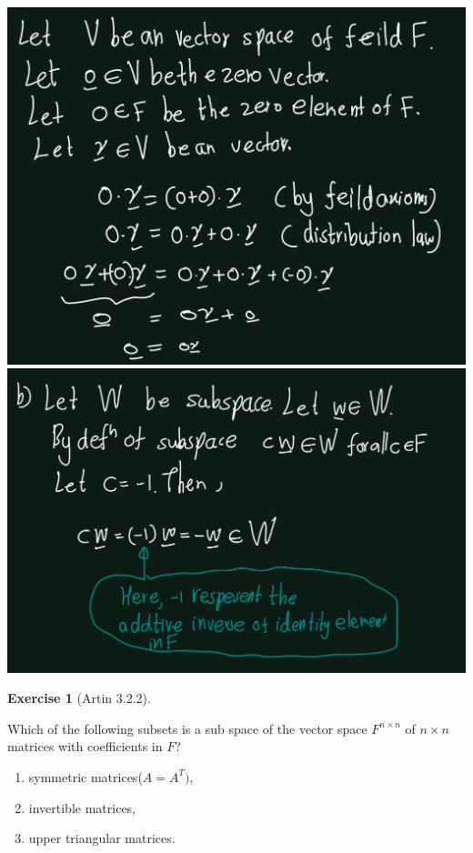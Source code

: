 \documentclass[
]{book}
\providecommand{\tightlist}{%
  \setlength{\itemsep}{0pt}\setlength{\parskip}{0pt}}
\theoremstyle{definition}
\theoremstyle{definition}
\theoremstyle{definition}
\newtheorem{exercise}{Exercise}[chapter]
\theoremstyle{definition}
\theoremstyle{remark}
\begin{document}
\includegraphics{figures/ch_3/ex-2.1-a.png}
\includegraphics{figures/ch_3/ex-2.1-b.png}

\begin{exercise}[Artin 3.2.2]
\protect\hypertarget{exr:unnamed-chunk-285}{}\label{exr:unnamed-chunk-285}

Which of the following subsets is a sub space of the vector space \(F^{n\times n}\) of \(n\times n\) matrices with coefficients in \(F\)?

\begin{enumerate}
\def\labelenumi{(\alph{enumi})}
\tightlist
\item
  symmetric matrices(\(A = A^T)\),
\item
  invertible matrices,
\item
  upper triangular matrices.
\end{enumerate}

\end{exercise}
\end{document}
